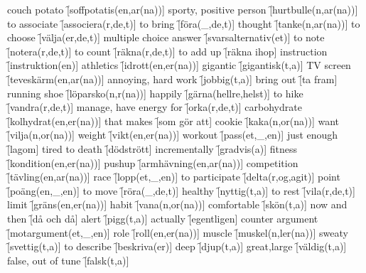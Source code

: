 \begin{questions}
    \begin{multicols}{2}
        \raggedcolumns
        \question couch potato \f[soffpotatis(en,ar(na))]
        \question sporty, positive person \f[hurtbulle(n,ar(na))]
        \question to associate \f[associera(r,de,t)]
        \question to bring \f[föra(\_,de,t)]
        \question thought \f[tanke(n,ar(na))]
        \question to choose \f[välja(er,de,t)]
        \question multiple choice answer \f[svarsalternativ(et)]
        \question to note \f[notera(r,de,t)]
        \question to count \f[räkna(r,de,t)]
        \question to add up \f[räkna ihop]
        \question instruction \f[instruktion(en)]
        \question athletics \f[idrott(en,er(na))]
        \question gigantic \f[gigantisk(t,a)]
        \question TV screen \f[teveskärm(en,ar(na))]
        \question annoying, hard work \f[jobbig(t,a)]
        \question bring out \f[ta fram]
        \question running shoe \f[löparsko(n,r(na))]
        \question happily \f[gärna(hellre,helst)]
        \question to hike \f[vandra(r,de,t)]
        \question manage, have energy for \f[orka(r,de,t)]
        \question carbohydrate \f[kolhydrat(en,er(na))]
        \question that makes \f[som gör att]
        \question cookie \f[kaka(n,or(na))]
        \question want \f[vilja(n,or(na))]
        \question weight \f[vikt(en,er(na))]
        \question workout \f[pass(et,\_,en)]
        \question just enough \f[lagom]
        \question tired to death \f[dödstrött]
        \question incrementally \f[gradvis(a)]
        \question fitness \f[kondition(en,er(na))]
        \question pushup \f[armhävning(en,ar(na))]
        \question competition \f[tävling(en,ar(na))]
        \question race \f[lopp(et,\_,en)]
        \question to participate \f[delta(r,og,agit)]
        \question point \f[poäng(en,\_,en)]
        \question to move \f[röra(\_,de,t)]
        \question healthy \f[nyttig(t,a)]
        \question to rest \f[vila(r,de,t)]
        \question limit \f[gräns(en,er(na))]
        \question habit \f[vana(n,or(na))]
        \question comfortable \f[skön(t,a)]
        \question now and then \f[då och då]
        \question alert \f[pigg(t,a)]
        \question actually \f[egentligen]
        \question counter argument \f[motargument(et,\_,en)]
        \question role \f[roll(en,er(na))]
        \question muscle \f[muskel(n,ler(na))]
        \question sweaty \f[svettig(t,a)]
        \question to describe \f[beskriva(er)]
        \question deep \f[djup(t,a)]
        \question great,large \f[väldig(t,a)]
        \question false, out of tune \f[falsk(t,a)]

\end{multicols}
\end{questions}
